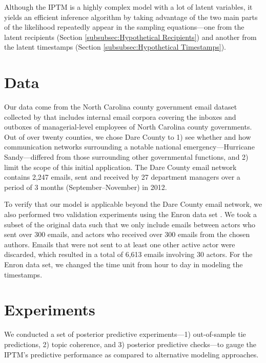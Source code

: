 \documentclass{article}
\begin{document}
 	   Although the IPTM is a highly complex model with a lot of latent variables, it yields an efficient inference algorithm by taking advantage of the two main parts of the likelihood  repeatedly appear in the sampling equations---one from the latent recipients (Section \ref{subsubsec:Hypothetical Recipients}) and another from the latent timestamps (Section \ref{subsubsec:Hypothetical Timestamps}). %
 	   
 	   \section{Data}\label{sec:Data}
 	   Our data come from the North Carolina county government email dataset collected by \cite{ben2017transparency} that includes internal email corpora covering the inboxes and outboxes of managerial-level employees of North Carolina county governments. Out of over twenty counties, we chose Dare County to 1) see whether and how communication networks surrounding a notable national emergency---Hurricane Sandy---differed from those surrounding other governmental functions, and 2) limit the scope of this initial application. The Dare County email network contains 2,247 emails, sent and received by 27 department managers over a period of 3 months (September--November) in 2012. 
 	   
 	   To verify that our model is applicable beyond the Dare County email network, we also performed two validation experiments using the Enron data set \cite{klimt2004introducing}. We took a subset of the original data such that we only include emails between actors who sent over 300 emails, and actors who received over 300 emails from the chosen authors. Emails that were not sent to at least one other active actor were discarded, which resulted in a total of 6,613 emails involving 30 actors. For the Enron data set, we changed the time unit from hour to day in modeling the timestamps.
 	   
 	   \section{Experiments}\label{sec:Experiments}
 	   We conducted a set of posterior predictive experiments---1) out-of-sample tie predictions, 2) topic coherence, and 3) posterior predictive checks---to gauge the IPTM's predictive performance as compared to alternative modeling approaches.
 	   
\end{document}
